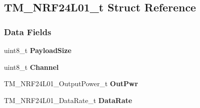 \hypertarget{struct_t_m___n_r_f24_l01__t}{}\subsection{T\+M\+\_\+\+N\+R\+F24\+L01\+\_\+t Struct Reference}
\label{struct_t_m___n_r_f24_l01__t}
\subsubsection*{Data Fields}
\begin{DoxyCompactItemize}
\item 
\hypertarget{struct_t_m___n_r_f24_l01__t_a65009968bd973163423516e80a11c82f}{}uint8\+\_\+t {\bfseries Payload\+Size}\label{struct_t_m___n_r_f24_l01__t_a65009968bd973163423516e80a11c82f}

\item 
\hypertarget{struct_t_m___n_r_f24_l01__t_a1ca6f01ca18afe402de51babe8c95f5e}{}uint8\+\_\+t {\bfseries Channel}\label{struct_t_m___n_r_f24_l01__t_a1ca6f01ca18afe402de51babe8c95f5e}

\item 
\hypertarget{struct_t_m___n_r_f24_l01__t_ae9c8e0b0be459f3515e9d1813d2152b8}{}T\+M\+\_\+\+N\+R\+F24\+L01\+\_\+\+Output\+Power\+\_\+t {\bfseries Out\+Pwr}\label{struct_t_m___n_r_f24_l01__t_ae9c8e0b0be459f3515e9d1813d2152b8}

\item 
\hypertarget{struct_t_m___n_r_f24_l01__t_a1ec61c7ff2c528cc421018afd7a36955}{}T\+M\+\_\+\+N\+R\+F24\+L01\+\_\+\+Data\+Rate\+\_\+t {\bfseries Data\+Rate}\label{struct_t_m___n_r_f24_l01__t_a1ec61c7ff2c528cc421018afd7a36955}

\end{DoxyCompactItemize}
